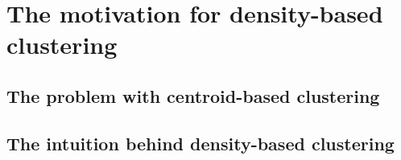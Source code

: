 \section{The motivation for density-based clustering}
  \subsection{The problem with centroid-based clustering}
  \subsection{The intuition behind density-based clustering}
